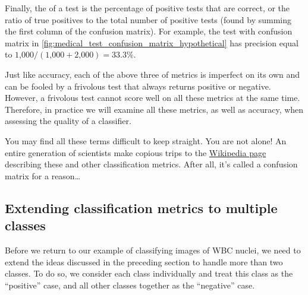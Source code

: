 Finally, the  of a test is the percentage of positive tests that are correct, or the ratio of true positives to the total number of positive tests (found by summing the first column of the confusion matrix). For example, the test with confusion matrix in \autoref{fig:medical_test_confusion_matrix_hypothetical} has precision equal to $\text{1,000}/(\text{1,000} + \text{2,000}) = 33.3\%$.\\

\begin{qbox}\end{qbox}

Just like accuracy, each of the above three of metrics is imperfect on its own and can be fooled by a frivolous test that always returns positive or negative. However, a frivolous test cannot score well on all these metrics at the same time. Therefore, in practice we will examine all these metrics, as well as accuracy, when assessing the quality of a classifier.\\

\begin{qbox}\end{qbox}

You may find all these terms difficult to keep straight. You are not alone! An entire generation of scientists make copious trips to the \href{https://en.wikipedia.org/wiki/Precision_and_recall#Definition_(classification_context)}{Wikipedia page} describing these and other classification metrics. After all, it's called a confusion matrix for a reason\ldots

\FloatBarrier
{}
\subsection{Extending classification metrics to multiple classes}

Before we return to our example of classifying images of WBC nuclei, we need to extend the ideas discussed in the preceding section to handle more than two classes. To do so, we consider each class individually and treat this class as the ``positive'' case, and all other classes together as the ``negative'' case.

